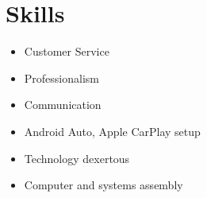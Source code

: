 \section{Skills}
\begin{itemize}
    \item Customer Service
    \item Professionalism
    \item Communication
    \item Android Auto, Apple CarPlay setup
    \item Technology dexertous
    \item Computer and systems assembly
\end{itemize}
